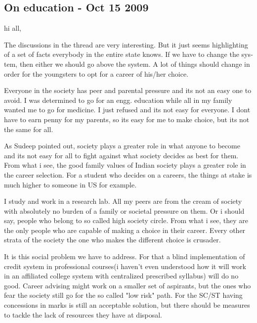 \newpage
\begin{english}

\subsection*{On education   - Oct 15 2009}


hi all,

The discussions in the thread are very interesting. But it just seems highlighting of a set of facts everybody in the entire state knows. If we have to change the system, then either we should go above the system. A lot of things should change in order for the youngsters to opt for a career of his/her choice.

Everyone in the society has peer and parental pressure and its not an easy one to avoid. I was determined to go for an engg. education while all in my family wanted me to go for medicine. I just refused and its not easy for everyone. I dont have to earn penny for my parents, so its easy for me to make choice, but its not the same for all.

As Sudeep pointed out, society plays a greater role in what anyone to become and its not easy for all to fight against what society decides as best for them. From what i see, the good family values of Indian society plays a greater role in the career selection. For a student who decides on a careers, the things at stake is much higher to someone in US for example. 

I study and work in a research lab. All my peers are from the cream of society with absolutely no burden of a family or societal pressure on them. Or i should say, people who belong to so called high society circle. From what i see, they are the only people who are capable of making a choice in their career. Every other strata of the society the one who makes the different choice is crusader.

It is this social problem we have to address. For that a blind implementation of credit system in professional courses(i haven't even understood how it will work in an affiliated college system with centralized prescribed syllabus) will do no good. Career advising might work on a smaller set of aspirants, but the ones who fear the society still go for the so called "low risk" path. For the SC/ST having concessions in marks is still an acceptable solution, but there should be measures to tackle the lack of resources they have at disposal.


\end{english}
